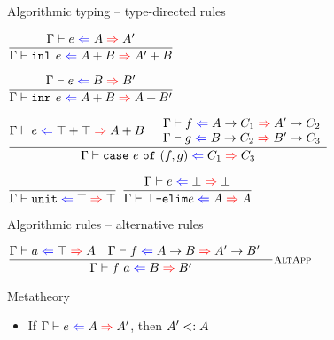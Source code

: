 \documentclass{beamer}
\begin{document}
\begin{frame}{Algorithmic typing -- type-directed rules}

\begin{center}
  $\infrule{\hinting{e}{A}{A'}}{\hinting{\inl{e}}{\Sum{A}{B}}{\Sum{A'}{B}}}$

  \vspace{2em}

  $\infrule{\hinting{e}{B}{B'}}{\hinting{\inr{e}}{\Sum{A}{B}}{\Sum{A}{B'}}}$

  \vspace{2em}

  $\infrule{\hinting{e}{\Sum{\Top}{\Top}}{\Sum{A}{B}} \quad \begin{array}{c} \hinting{f}{\Fun{A}{C_1}}{\Fun{A'}{C_2}} \\ \hinting{g}{\Fun{B}{C_2}}{\Fun{B'}{C_3}} \end{array}}{\hinting{\case{e}{f}{g}}{C_1}{C_3}}$

  \vspace{2em}

  $\infrule{}{\hinting{\unit}{\Top}{\Top}}$ \quad
  $\infrule{\hinting{e}{\Bot}{\Bot}}{\hinting{\botelim{e}}{A}{A}}$
\end{center}

\end{frame}

\begin{frame}{Algorithmic rules -- alternative rules}

\begin{center}
  $\infrule[AltApp]{\hinting{a}{\Top}{A} \quad \hinting{f}{\Fun{A}{B}}{\Fun{A'}{B'}} \quad }{\hinting{\app{f}{a}}{B}{B'}}$
\end{center}

\end{frame}

\begin{frame}{Metatheory}

\begin{itemize}
  \item If $\hinting{e}{A}{A'}$, then $A' <: A$
\end{itemize}

\end{frame}
\end{document}
